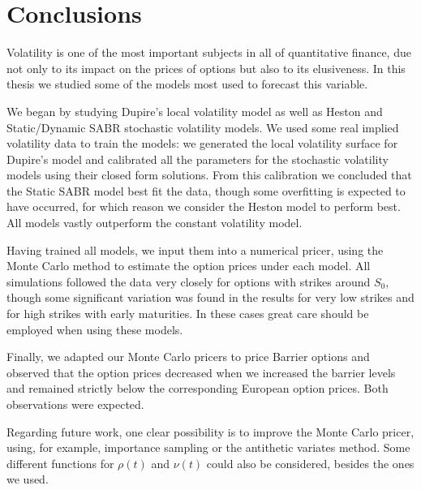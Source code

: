 
\section{Conclusions}
\label{sec:concl}
Volatility is one of the most important subjects in all of quantitative finance, due not only to its impact on the prices of options but also to its elusiveness. In this thesis we studied some of the models most used to forecast this variable.

We began by studying Dupire's local volatility model as well as Heston and Static/Dynamic SABR stochastic volatility models. We used some real implied volatility data to train the models: we generated the local volatility surface for Dupire's model and calibrated all the parameters for the stochastic volatility models using their closed form solutions.
From this calibration we concluded that the Static SABR model best fit the data, though some overfitting is expected to have occurred, for which reason we consider the Heston model to perform best. All models vastly outperform the constant volatility model.

Having trained all models, we input them into a numerical pricer, using the Monte Carlo method to estimate the option prices under each model. All simulations followed the data very closely for options with strikes around $S_0$, though some significant variation was found in the results for very low strikes and for high strikes with early maturities. In these cases great care should be employed when using these models.

Finally, we adapted our Monte Carlo pricers to price Barrier options and observed that the option prices decreased when we increased the barrier levels and remained strictly below the corresponding European option prices. Both observations were expected.

Regarding future work, one clear possibility is to improve the Monte Carlo pricer, using, for example, importance sampling or the antithetic variates method. Some different functions for $\rho(t)$ and $\nu(t)$ could also be considered, besides the ones we used.